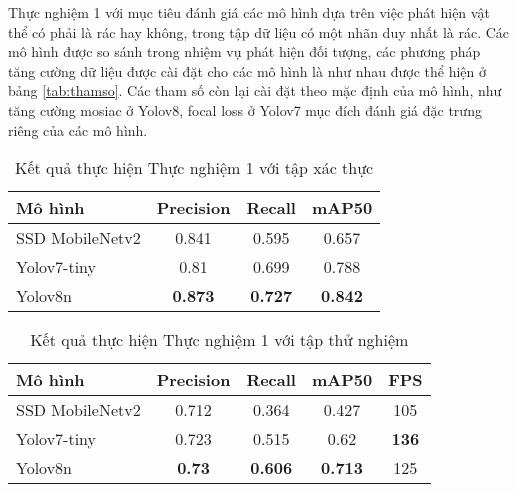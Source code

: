 \documentclass[../the.tex]{subfiles}
\begin{document}
{\fontsize{13}{12} \selectfont
Thực nghiệm 1 với mục tiêu đánh giá các mô hình dựa trên việc phát hiện vật thể có phải là rác hay không, trong tập dữ liệu có một nhãn duy nhất là rác.
Các mô hình được so sánh trong nhiệm vụ phát hiện đối tượng, các phương pháp tăng cường dữ liệu được cài đặt cho các mô hình là như nhau được thể hiện ở bảng \ref{tab:thamso}.
Các tham số còn lại cài đặt theo mặc định của mô hình, như tăng cường mosiac ở Yolov8, focal loss ở Yolov7 mục đích đánh giá đặc trưng riêng của các mô hình.

}
\begin{table}[h!]
    \centering
    \caption{Kết quả thực hiện Thực nghiệm 1 với tập xác thực}
    \begin{tabular}{|l|c|c|c|}
        \hline
        \textbf{Mô hình}  & \textbf{Precision} & \textbf{Recall} & \textbf{mAP50} \\ \hline
        SSD   MobileNetv2 & 0.841               & 0.595           & 0.657          \\ \hline
        Yolov7-tiny       & 0.81               & 0.699           & 0.788          \\ \hline
        Yolov8n           & \textbf{0.873}     & \textbf{0.727}  & \textbf{0.842} \\ \hline
    \end{tabular}
    \label{tab:thucnghiem1.1}
\end{table}

\begin{table}[h!]
    \centering
    \caption{Kết quả thực hiện Thực nghiệm 1 với tập thử nghiệm}
    \begin{tabular}{|l|c|c|c|c|}
        \hline
        \textbf{Mô hình}  & \textbf{Precision} & \textbf{Recall} & \textbf{mAP50} & \multicolumn{1}{l|}{\textbf{FPS}} \\ \hline
        SSD MobileNetv2 & 0.712               & 0.364           & 0.427          & 105                               \\ \hline
        Yolov7-tiny       & 0.723              & 0.515           & 0.62          & \textbf{136}                      \\ \hline
        Yolov8n           & \textbf{0.73}     & \textbf{0.606}  & \textbf{0.713} & 125                               \\ \hline
    \end{tabular}
    \label{tab:thucnghiem1.2}
\end{table}
\end{document}
